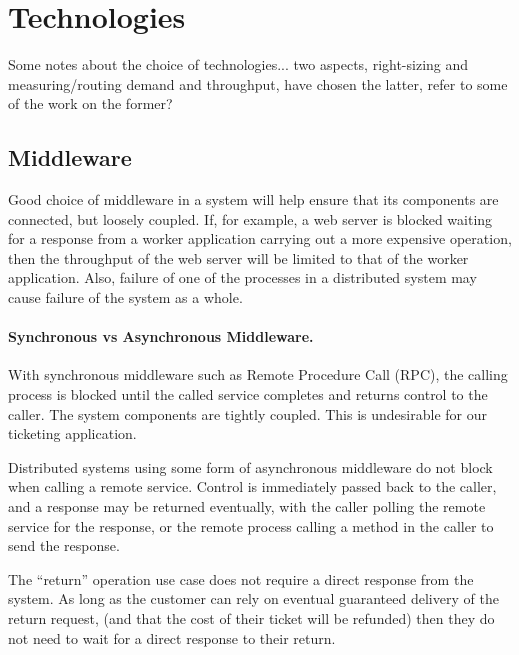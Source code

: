 %
%

\section{Technologies}\label{sec:technologies}
\begin{shaded}
Some notes about the choice of technologies... two aspects, right-sizing and measuring/routing demand and throughput, have chosen the latter, refer to some of the work on the former?
\end{shaded}

%
%

\subsection{Middleware}\label{sec:middleware}

Good choice of middleware in a system will help ensure that its components are connected, but loosely coupled.  If, for example, a web server is blocked waiting for a response from a worker application carrying out a more expensive operation, then the throughput of the web server will be limited to that of the worker application.  Also, failure of one of the processes in a distributed system may cause failure of the system as a whole.

\paragraph{Synchronous vs Asynchronous Middleware.}
With synchronous middleware such as Remote Procedure Call (RPC), the calling process is blocked until the called service completes and returns control to the caller.  The system components are tightly coupled.  This is undesirable for our ticketing application.

Distributed systems using some form of asynchronous middleware do not block when calling a remote service.  Control is immediately passed back to the caller, and a response may be returned eventually, with the caller polling the remote service for the response, or the remote process calling a method in the caller to send the response.

The ``return'' operation use case does not require a direct response from the system.  As long as the customer can rely on eventual guaranteed delivery of the return request, (and that the cost of their ticket will be refunded) then they do not need to wait for a direct response to their return.

